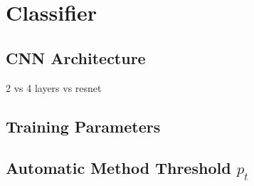 \section{Classifier}

\subsection{CNN Architecture}
2 vs 4 layers vs resnet

\subsection{Training Parameters}

\subsection{Automatic Method Threshold $p_t$}
